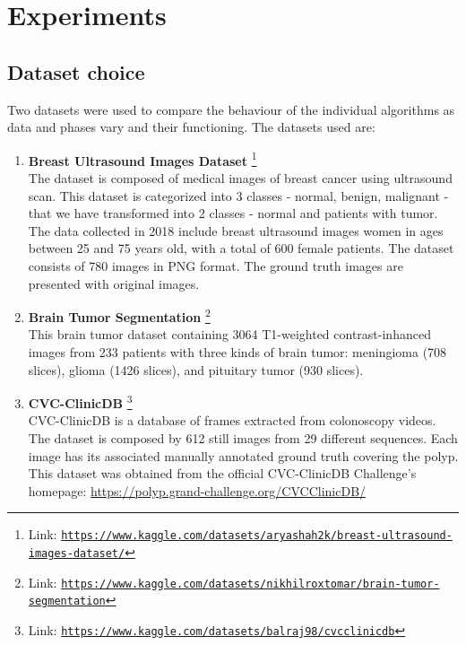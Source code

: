 \section{Experiments}
\subsection{Dataset choice}\label{dataset}
Two datasets were used to compare the behaviour of the individual algorithms as data and phases vary and their functioning.
The datasets used are:
\begin{enumerate}
    \item \textbf{Breast Ultrasound Images Dataset} \cite{al2020dataset} \footnote{Link: \texttt{\url{https://www.kaggle.com/datasets/aryashah2k/breast-ultrasound-images-dataset/}}}\\The dataset is composed of medical images of breast cancer using ultrasound scan. This dataset is categorized into 3 classes - normal, benign, malignant - that we have transformed into 2 classes - normal and patients with tumor. The data collected in 2018 include breast ultrasound images women in ages between 25 and 75 years old, with a total of 600 female patients. The dataset consists of 780 images in PNG format. The ground truth images are presented with original images.
    \item \textbf{Brain Tumor Segmentation} \cite{Cheng2017} \footnote{Link: \texttt{\url{https://www.kaggle.com/datasets/nikhilroxtomar/brain-tumor-segmentation}}} \\This brain tumor dataset containing 3064 T1-weighted contrast-inhanced images from 233 patients with three kinds of brain tumor: meningioma (708 slices), glioma (1426 slices), and pituitary tumor (930 slices). 
    \item \textbf{CVC-ClinicDB} \cite{PMID:25863519} \footnote{Link: \texttt{\url{https://www.kaggle.com/datasets/balraj98/cvcclinicdb}}}\\
    CVC-ClinicDB is a database of frames extracted from colonoscopy videos. The dataset is composed by 612 still images from 29 different sequences. Each image has its associated manually annotated ground truth covering the polyp. This dataset was obtained from the official CVC-ClinicDB Challenge's homepage: \url{https://polyp.grand-challenge.org/CVCClinicDB/} 
\end{enumerate}

